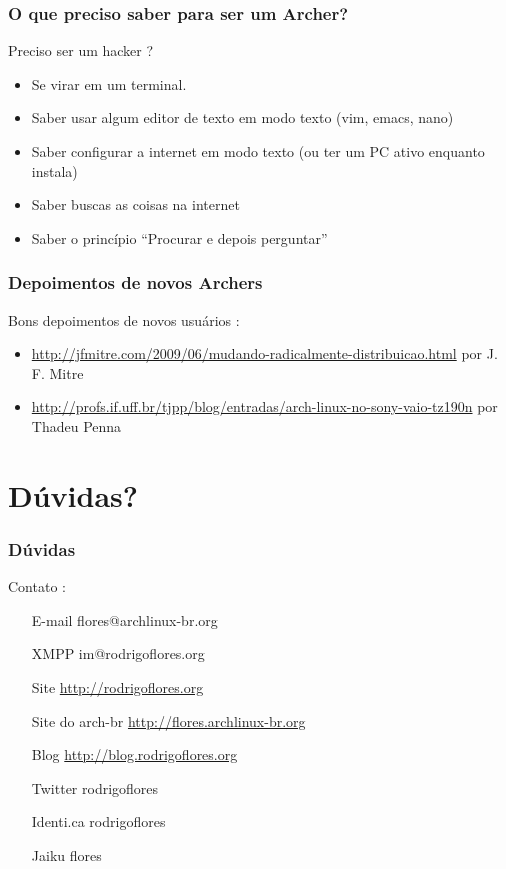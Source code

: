 \documentclass{beamer}
\begin{document}
\begin{frame}
    \frametitle{O que preciso saber para ser um Archer?}
    \begin{block}{Preciso ser um hacker ?}
        \begin{itemize}
            \item<1-> Se virar em um terminal. 
            \item<2-> Saber usar algum editor de texto em modo texto (vim, emacs, nano) 
            \item<3-> Saber configurar a internet em modo texto (ou ter um PC ativo enquanto instala)
            \item<4-> Saber buscas as coisas na internet
            \item<5-> Saber o princípio ``Procurar e depois perguntar''
        \end{itemize}
    \end{block}
\end{frame}

\begin{frame}
        \frametitle{Depoimentos de novos Archers}
        \begin{block}{Bons depoimentos de novos usuários :}
            \begin{itemize}
                \item \url{http://jfmitre.com/2009/06/mudando-radicalmente-distribuicao.html} por J. F. Mitre
                \item \url{ http://profs.if.uff.br/tjpp/blog/entradas/arch-linux-no-sony-vaio-tz190n} por Thadeu Penna
            \end{itemize}
        \end{block}
\end{frame}


\section{Dúvidas?}

\begin{frame}
    \frametitle{Dúvidas}
    \begin{block}{Contato :}
        \begin{itemize}
            \centering
            \item[E-mail] flores@archlinux-br.org        
            \item[XMPP]  im@rodrigoflores.org        
            \item[Site]  \url{http://rodrigoflores.org}
            \item[Site do arch-br]  \url{http://flores.archlinux-br.org}
            \item[Blog]  \url{http://blog.rodrigoflores.org}        
            \item[Twitter] rodrigoflores        
            \item[Identi.ca] rodrigoflores        
            \item[Jaiku] flores        
        \end{itemize}
    \end{block}

\end{frame}
\end{document}
